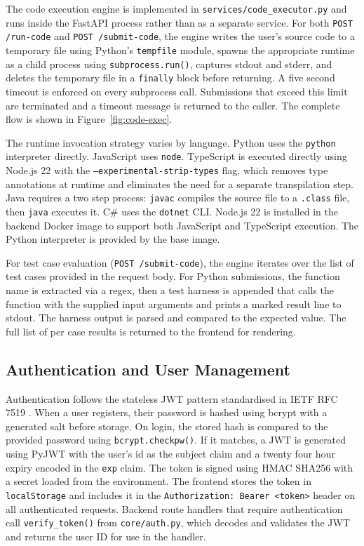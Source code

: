 The code execution engine is implemented in
\texttt{services/code\_executor.py} and runs inside the FastAPI process
rather than as a separate service. For both \texttt{POST /run-code} and
\texttt{POST /submit-code}, the engine writes the user's source code to
a temporary file using Python's \texttt{tempfile} module, spawns the
appropriate runtime as a child process using \texttt{subprocess.run()},
captures stdout and stderr, and deletes the temporary file in a
\texttt{finally} block before returning. A five second timeout is
enforced on every subprocess call. Submissions that exceed this limit
are terminated and a timeout message is returned to the caller. The complete flow is shown in Figure~\ref{fig:code-exec}.

The runtime invocation strategy varies by language. Python uses the
\texttt{python} interpreter directly. JavaScript uses \texttt{node}.
TypeScript is executed directly using Node.js 22 with the
\texttt{--experimental-strip-types} flag, which removes type annotations
at runtime and eliminates the need for a separate transpilation step.
Java requires a two step process: \texttt{javac} compiles the source file
to a \texttt{.class} file, then \texttt{java} executes it. C\# uses the
\texttt{dotnet} CLI. Node.js 22 is installed in the backend Docker image
to support both JavaScript and TypeScript execution. The Python
interpreter is provided by the base image.

For test case evaluation (\texttt{POST /submit-code}), the engine
iterates over the list of test cases provided in the request body. For
Python submissions, the function name is extracted via a regex, then a
test harness is appended that calls the function with the supplied
input arguments and prints a marked result line to stdout. The harness
output is parsed and compared to the expected value. The full list of
per case results is returned to the frontend for rendering.

\subsection{Authentication and User Management}

Authentication follows the stateless JWT pattern standardised in IETF
RFC 7519 \cite{jwt2015}. When a user registers, their password is
hashed using bcrypt \cite{provos1999bcrypt} with a generated salt
before storage. On login, the stored hash is compared to the provided
password using \texttt{bcrypt.checkpw()}. If it matches, a JWT is
generated using PyJWT with the user's id as the subject claim and a
twenty four hour expiry encoded in the \texttt{exp} claim. The token
is signed using HMAC SHA256 with a secret loaded from the environment.
The frontend stores the token in \texttt{localStorage} and includes it
in the \texttt{Authorization: Bearer <token>} header on all
authenticated requests. Backend route handlers that require
authentication call \texttt{verify\_token()} from \texttt{core/auth.py},
which decodes and validates the JWT and returns the user ID for use
in the handler.

